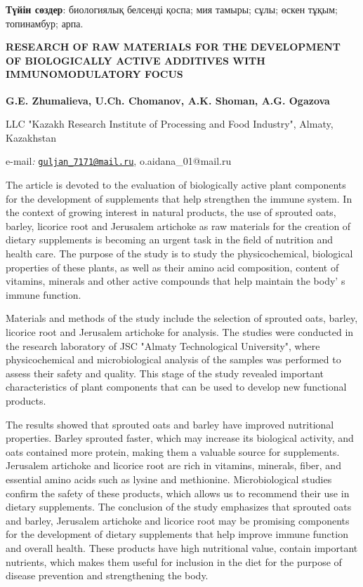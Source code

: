 {\bfseries Түйін сөздер}: биологиялық белсенді қоспа; мия тамыры; сұлы;
өскен тұқым; топинамбур; арпа.

{\bfseries RESEARCH OF RAW MATERIALS FOR THE DEVELOPMENT OF BIOLOGICALLY
ACTIVE ADDITIVES WITH IMMUNOMODULATORY FOCUS}

{\bfseries G.E. Zhumalieva\textsuperscript{\envelope }, U.Ch. Chomanov, A.K. Shoman,
A.G. Ogazova\textsuperscript{\envelope }}

LLC "Kazakh Research Institute of Processing and Food Industry", Almaty,
Kazakhstan

e-mail\emph{:}
\href{mailto:guljan_7171@mail.ru}{\nolinkurl{guljan\_7171@mail.ru}},
o.aidana\_01@mail.ru

The article is devoted to the evaluation of biologically active plant
components for the development of supplements that help strengthen the
immune system. In the context of growing interest in natural products,
the use of sprouted oats, barley, licorice root and Jerusalem artichoke
as raw materials for the creation of dietary supplements is becoming an
urgent task in the field of nutrition and health care. The purpose of
the study is to study the physicochemical, biological properties of
these plants, as well as their amino acid composition, content of
vitamins, minerals and other active compounds that help maintain the
body' s immune function.

Materials and methods of the study include the selection of sprouted
oats, barley, licorice root and Jerusalem artichoke for analysis. The
studies were conducted in the research laboratory of JSC "Almaty
Technological University", where physicochemical and microbiological
analysis of the samples was performed to assess their safety and
quality. This stage of the study revealed important characteristics of
plant components that can be used to develop new functional products.

The results showed that sprouted oats and barley have improved
nutritional properties. Barley sprouted faster, which may increase its
biological activity, and oats contained more protein, making them a
valuable source for supplements. Jerusalem artichoke and licorice root
are rich in vitamins, minerals, fiber, and essential amino acids such as
lysine and methionine. Microbiological studies confirm the safety of
these products, which allows us to recommend their use in dietary
supplements. The conclusion of the study emphasizes that sprouted oats
and barley, Jerusalem artichoke and licorice root may be promising
components for the development of dietary supplements that help improve
immune function and overall health. These products have high nutritional
value, contain important nutrients, which makes them useful for
inclusion in the diet for the purpose of disease prevention and
strengthening the body.

